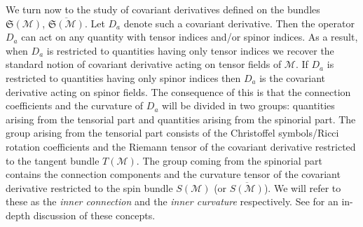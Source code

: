 \documentclass[final,3p,times,twocolumn]{elsarticle}
\begin{document}
We turn now to the study of covariant derivatives defined on the bundles 
$\mathfrak{S}(\mathcal M)$, $\overline{\mathfrak{S}(\mathcal M)}$. Let $D_a$ denote such a covariant derivative. Then the operator $D_a$ can act on any quantity with tensor indices and/or spinor indices. As a result, when $D_a$ is restricted to quantities having only tensor indices  we recover the standard notion of covariant derivative acting on tensor fields of $\mathcal M$. If $D_a$ is restricted to quantities having only spinor indices then $D_a$ is the covariant derivative acting on spinor fields. The consequence of this is that the connection coefficients and the curvature of $D_a$ will be divided in two groups: quantities arising from the tensorial part and quantities arising from the spinorial part. The group arising from the tensorial part consists of the Christoffel symbols/Ricci rotation coefficients and the Riemann tensor of the covariant derivative restricted to the tangent bundle $T(\mathcal M)$. The group coming from the spinorial part contains the connection components and the curvature tensor of the covariant derivative restricted to the spin bundle $S(\mathcal M)$ (or $\overline{S(\mathcal M)}$). 
We will refer to these as the {\em inner connection} and the {\em inner curvature} respectively. See \cite{ASHTEKAR,ASHTEKAR-CALCULUS} for an in-depth discussion of these concepts.
\end{document}
